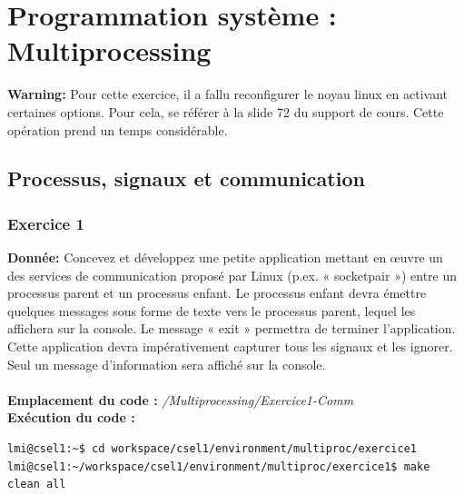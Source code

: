 \section{Programmation système : Multiprocessing}
\textbf{Warning: } Pour cette exercice, il a fallu reconfigurer le noyau linux en activant certaines options. Pour cela, se référer à la slide 72 du support de cours. Cette opération prend un temps considérable.
\subsection{Processus, signaux et communication}
\subsubsection{Exercice 1}
\textbf{Donnée:} Concevez	et	développez	une	petite	application	mettant	en	œuvre	un	des	services	de	communication
proposé	par	Linux	(p.ex.	« socketpair ») entre	un	processus	parent	et	un	processus	enfant.	
Le	processus	enfant	devra	émettre	quelques	messages	sous	forme	de	texte	vers	le	processus	parent,	
lequel	les	affichera	sur	la	console.	Le	message	« exit »	permettra	de	terminer	l’application.
Cette	application	devra	impérativement	capturer	tous	les	signaux	et	les	ignorer.	Seul	un	message	
d’information	sera	affiché	sur	la	console.\\\\
\textbf{Emplacement du code : } \textit{/Multiprocessing/Exercice1-Comm}\\

\textbf{Exécution du code : } \\
\begin{lstlisting}
lmi@csel1:~$ cd workspace/csel1/environment/multiproc/exercice1
lmi@csel1:~/workspace/csel1/environment/multiproc/exercice1$ make clean all
\end{lstlisting}


